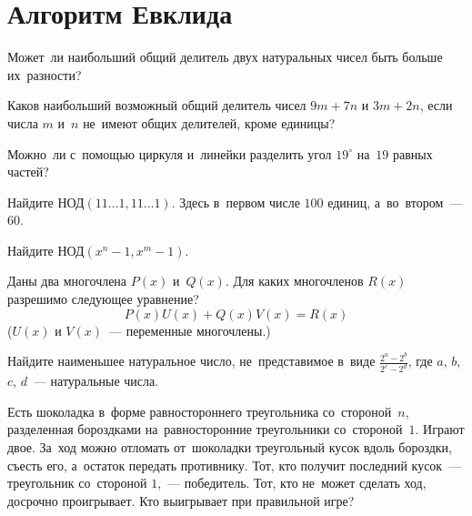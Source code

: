 
\section*{Алгоритм Евклида}



\begin{problems}

\item
Может~ли наибольший общий делитель двух натуральных чисел быть больше
их~разности?

\item
Каков наибольший возможный общий делитель чисел $9 m + 7 n$ и $3 m + 2 n$, если
числа $m$ и~$n$ не~имеют общих делителей, кроме единицы?

\item
Можно~ли с~помощью циркуля и~линейки разделить угол $19^\circ$ на~$19$ равных
частей?

\item
Найдите $\text{НОД}(11\ldots1, 11\ldots1)$.
Здесь в~первом числе $100$ единиц, а~во~втором~--- $60$.

\item
Найдите $\text{НОД}(x^{n} - 1, x^{m} - 1)$.

\item
Даны два многочлена $P(x)$ и~$Q(x)$.
Для каких многочленов $R(x)$ разрешимо следующее уравнение?
\[
    P(x) U(x) + Q(x) V(x) = R(x)
\]
($U(x)$ и $V(x)$~--- переменные многочлены.)

\item
Найдите наименьшее натуральное число, не~представимое в~виде
$\frac{2^a - 2^b}{2^c - 2^d}$, где $a$, $b$, $c$, $d$~--- натуральные числа.

\item
Есть шоколадка в~форме равностороннего треугольника со~стороной~$n$,
разделенная бороздками на~равносторонние треугольники со~стороной~$1$.
Играют двое.
За~ход можно отломать от~шоколадки треугольный кусок вдоль бороздки, съесть
его, а~остаток передать противнику.
Тот, кто получит последний кусок~--- треугольник со~стороной $1$,~---
победитель.
Тот, кто не~может сделать ход, досрочно проигрывает.
Кто выигрывает при правильной игре?

\end{problems}

